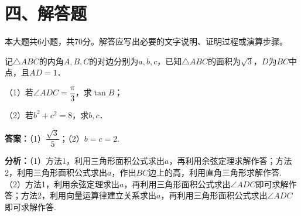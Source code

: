 \section*{四、解答题}
本大题共6小题，共70分。解答应写出必要的文字说明、证明过程或演算步骤。

\begin{question}[points=10]
记$\triangle ABC$的内角$A,B,C$的对边分别为$a,b,c$，已知$\triangle ABC$的面积为$\sqrt{3}$，$D$为$BC$中点，且$AD=1$．

（1）若$\angle ADC=\dfrac{\pi}{3}$，求$\tan B$；

（2）若$b^{2}+c^{2}=8$，求$b,c$．
\begin{solution}
\textbf{答案：}（1）$\dfrac{\sqrt{3}}{5}$；（2）$b=c=2$.

\textbf{分析：}（1）方法1，利用三角形面积公式求出$a$，再利用余弦定理求解作答；方法2，利用三角形面积公式求出$a$，作出$BC$边上的高，利用直角三角形求解作答.
（2）方法1，利用余弦定理求出$a$，再利用三角形面积公式求出$\angle ADC$即可求解作答；方法2，利用向量运算律建立关系求出$a$，再利用三角形面积公式求出$\angle ADC$即可求解作答.


\end{solution}
\end{question}

